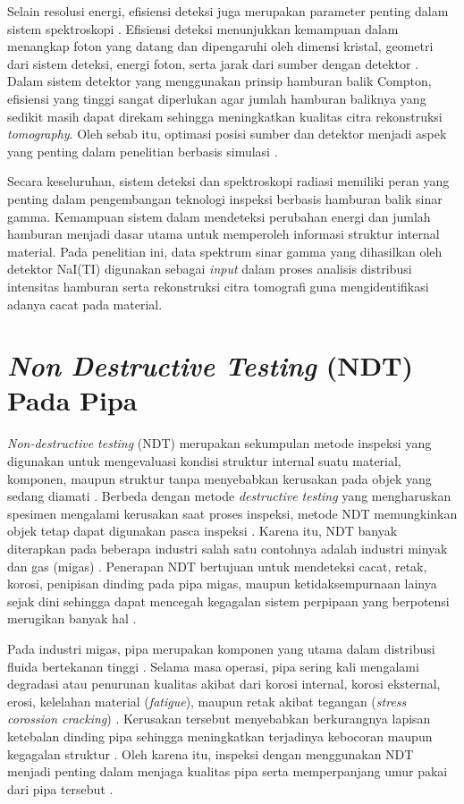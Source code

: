 \documentclass[12pt,a4paper]{report}
\begin{document}
Selain resolusi energi, efisiensi deteksi juga merupakan parameter penting dalam sistem spektroskopi \cite{sihotang2025analisis}. Efisiensi deteksi menunjukkan kemampuan dalam menangkap foton yang datang dan dipengaruhi oleh dimensi kristal, geometri dari sistem deteksi, energi foton, serta jarak dari sumber dengan detektor \cite{oktajianto2015gamma}. Dalam sistem detektor yang menggunakan prinsip hamburan balik Compton, efisiensi yang tinggi sangat diperlukan agar jumlah hamburan baliknya yang sedikit masih dapat direkam sehingga 
meningkatkan kualitas citra rekonstruksi \textit{tomography}. Oleh sebab itu, optimasi posisi sumber dan detektor menjadi aspek yang penting dalam penelitian berbasis simulasi \cite{oktajianto2015gamma}.

Secara keseluruhan, sistem deteksi dan spektroskopi radiasi memiliki peran yang penting dalam pengembangan teknologi inspeksi berbasis hamburan balik sinar gamma. Kemampuan sistem dalam mendeteksi perubahan energi dan jumlah hamburan menjadi dasar utama untuk memperoleh informasi struktur internal material. Pada penelitian ini, data spektrum sinar gamma yang dihasilkan oleh detektor NaI(TI) digunakan sebagai \textit{input} dalam proses analisis distribusi intensitas hamburan serta 
rekonstruksi citra tomografi guna mengidentifikasi adanya cacat pada material.

\section{\textit{Non Destructive Testing} (NDT) Pada Pipa}

\textit{Non-destructive testing} (NDT) merupakan sekumpulan metode inspeksi yang digunakan untuk mengevaluasi kondisi struktur internal suatu material, komponen, maupun struktur tanpa menyebabkan kerusakan pada objek yang sedang diamati \cite{silva2023review}. Berbeda dengan metode \textit{destructive testing} yang mengharuskan spesimen mengalami kerusakan saat proses inspeksi, metode NDT memungkinkan objek tetap dapat digunakan pasca inspeksi \cite{abdollahi2025non}. Karena itu, NDT banyak diterapkan pada beberapa industri salah 
satu contohnya adalah industri minyak dan gas (migas) \cite{wang2024basic}. Penerapan NDT bertujuan untuk mendeteksi cacat, retak, korosi, penipisan dinding pada pipa migas, maupun ketidaksempurnaan lainya sejak dini sehingga dapat mencegah kegagalan sistem perpipaan yang berpotensi merugikan banyak hal \cite{tian2024non}.

Pada industri migas, pipa merupakan komponen yang utama dalam distribusi fluida bertekanan tinggi \cite{wang2024basic}. Selama masa operasi, pipa sering kali mengalami degradasi atau penurunan kualitas akibat dari korosi internal, korosi eksternal, erosi, kelelahan material (\textit{fatigue}), maupun retak akibat tegangan (\textit{stress corossion cracking}) \cite{odor2024advanced}. Kerusakan tersebut menyebabkan berkurangnya lapisan ketebalan dinding pipa sehingga meningkatkan terjadinya kebocoran maupun kegagalan struktur \cite{tian2024non}. Oleh karena itu, 
inspeksi dengan menggunakan NDT menjadi penting dalam menjaga kualitas pipa serta memperpanjang umur pakai dari pipa tersebut \cite{silva2023review}.
\end{document}

